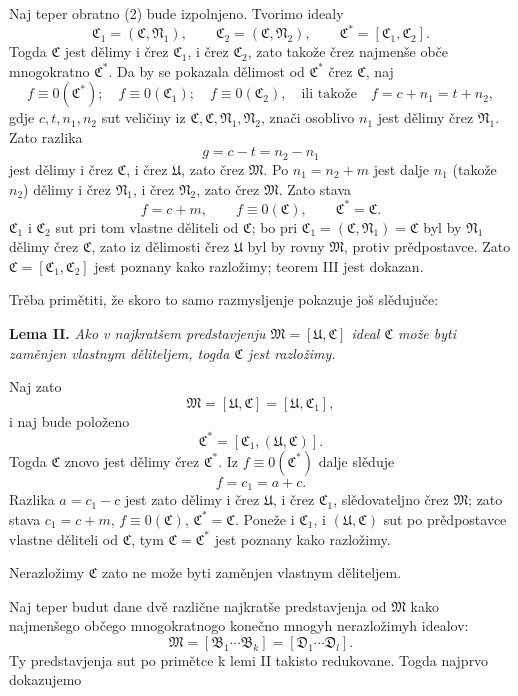 \documentclass[11pt]{article}
\newcommand{\ideal}[1]{\mathfrak{#1}}
\begin{document}
Naj teper obratno (2) bude izpolnjeno. Tvorimo idealy
\[
 \ideal C_1=(\ideal C,\ideal N_1),\qquad
 \ideal C_2=(\ideal C,\ideal N_2),\qquad
 \ideal C^*=[\ideal C_1,\ideal C_2].
\]
Togda \(\ideal C\) jest dělimy i črez \(\ideal C_1\), i črez \(\ideal C_2\), zato takože črez najmenše obče mnogokratno \(\ideal C^*\). Da by se pokazala dělimost od \(\ideal C^*\) črez \(\ideal C\), naj
\[
 f\equiv0(\ideal C^*);\quad f\equiv0(\ideal C_1);\quad f\equiv0(\ideal C_2),
 \quad\text{ili takože}\quad f=c+n_1=t+n_2,
\]
gdje \(c,t,n_1,n_2\) sut veličiny iz \(\ideal C,\ideal C,\ideal N_1,\ideal N_2\), znači osoblivo \(n_1\) jest dělimy črez \(\ideal N_1\). Zato razlika
\[
 g=c-t=n_2-n_1
\]
jest dělimy i črez \(\ideal C\), i črez \(\ideal U\), zato črez \(\ideal M\). Po \(n_1=n_2+m\) jest dalje \(n_1\) (takože \(n_2\)) dělimy i črez \(\ideal N_1\), i črez \(\ideal N_2\), zato črez \(\ideal M\). Zato stava
\[
 f=c+m,\qquad f\equiv0(\ideal C),\qquad \ideal C^*=\ideal C.
\]
\(\ideal C_1\) i \(\ideal C_2\) sut pri tom vlastne děliteli od \(\ideal C\); bo pri \(\ideal C_1=(\ideal C,\ideal N_1)=\ideal C\) byl by \(\ideal N_1\) dělimy črez \(\ideal C\), zato iz dělimosti črez \(\ideal U\) byl by rovny \(\ideal M\), protiv prědpostavce. Zato \(\ideal C=[\ideal C_1,\ideal C_2]\) jest poznany kako razložimy; teorem III jest dokazan.

Trěba primětiti, že skoro to samo razmysljenje pokazuje još slědujuče:

\textbf{Lema II.} \emph{Ako v najkratšem predstavjenju \(\ideal M=[\ideal U,\ideal C]\) ideal \(\ideal C\) može byti zaměnjen vlastnym děliteljem, togda \(\ideal C\) jest razložimy.}

Naj zato
\[
 \ideal M=[\ideal U,\ideal C]=[\ideal U,\ideal C_1],
\]
i naj bude položeno
\[
 \ideal C^*=[\ideal C_1,(\ideal U,\ideal C)].
\]
Togda \(\ideal C\) znovo jest dělimy črez \(\ideal C^*\). Iz \(f\equiv0(\ideal C^*)\) dalje slěduje
\[
 f=c_1=a+c.
\]
Razlika \(a=c_1-c\) jest zato dělimy i črez \(\ideal U\), i črez \(\ideal C_1\), slědovateljno črez \(\ideal M\); zato stava \(c_1=c+m\), \(f\equiv0(\ideal C)\), \(\ideal C^*=\ideal C\). Poneže i \(\ideal C_1\), i \((\ideal U,\ideal C)\) sut po prědpostavce vlastne děliteli od \(\ideal C\), tym \(\ideal C=\ideal C^*\) jest poznany kako razložimy.

Nerazložimy \(\ideal C\) zato ne može byti zaměnjen vlastnym děliteljem.

Naj teper budut dane dvě različne najkratše predstavjenja od \(\ideal M\) kako najmenšego občego mnogokratnogo konečno mnogyh nerazložimyh idealov:
\[
 \ideal M=[\ideal B_1\cdots\ideal B_k]=[\ideal D_1\cdots\ideal D_l].
\]
Ty predstavjenja sut po primětce k lemi II takisto redukovane. Togda najprvo dokazujemo
\end{document}
